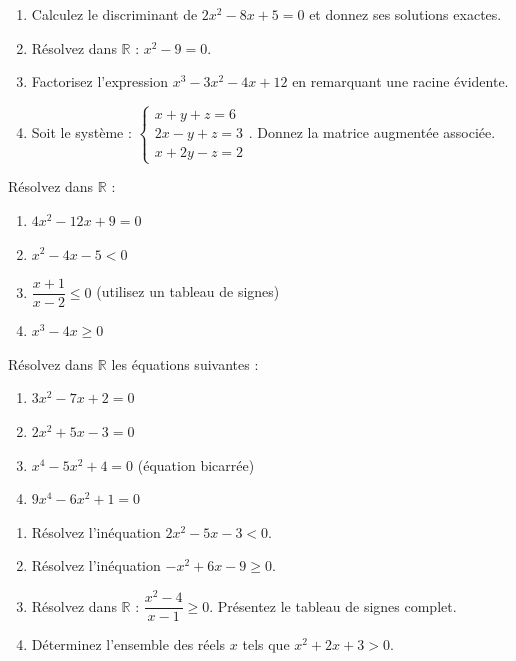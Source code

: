 \documentclass[11pt]{article}
\newcounter{popsec}
\newcounter{popsub}
\newcommand{\courssub}[1]{%
  \stepcounter{popsub}%
  \par\vspace{9pt}\noindent{\popxbold\fontsize{11.5}{13}\selectfont\color{popink}{\color{poporange}\thepopsec.\thepopsub}\hspace{6pt}#1}\par\nopagebreak\vspace{4pt}
}
\begin{document}
\begin{exercice}
\begin{enumerate}
\item Calculez le discriminant de $2x^2 - 8x + 5 = 0$ et donnez ses solutions exactes.
\item Résolvez dans $\mathbb{R}$ : $x^2 - 9 = 0$.
\item Factorisez l'expression $x^3 - 3x^2 - 4x + 12$ en remarquant une racine évidente.
\item Soit le système : $\begin{cases} x + y + z = 6 \\ 2x - y + z = 3 \\ x + 2y - z = 2 \end{cases}$. Donnez la matrice augmentée associée.
\end{enumerate}
\end{exercice}

\begin{exercice}
Résolvez dans $\mathbb{R}$ :
\begin{enumerate}
\item $4x^2 - 12x + 9 = 0$
\item $x^2 - 4x - 5 < 0$
\item $\dfrac{x+1}{x-2} \le 0$ (utilisez un tableau de signes)
\item $x^3 - 4x \ge 0$
\end{enumerate}
\end{exercice}

\courssub{Je m'entraîne}

\begin{exercice}
Résolvez dans $\mathbb{R}$ les équations suivantes :
\begin{enumerate}
\item $3x^2 - 7x + 2 = 0$
\item $2x^2 + 5x - 3 = 0$
\item $x^4 - 5x^2 + 4 = 0$ \quad (équation bicarrée)
\item $9x^4 - 6x^2 + 1 = 0$
\end{enumerate}
\end{exercice}

\begin{exercice}
\begin{enumerate}
\item Résolvez l'inéquation $2x^2 - 5x - 3 < 0$.
\item Résolvez l'inéquation $-x^2 + 6x - 9 \ge 0$.
\item Résolvez dans $\mathbb{R}$ : $\dfrac{x^2 - 4}{x - 1} \ge 0$. Présentez le tableau de signes complet.
\item Déterminez l'ensemble des réels $x$ tels que $x^2 + 2x + 3 > 0$.
\end{enumerate}
\end{exercice}
\end{document}
